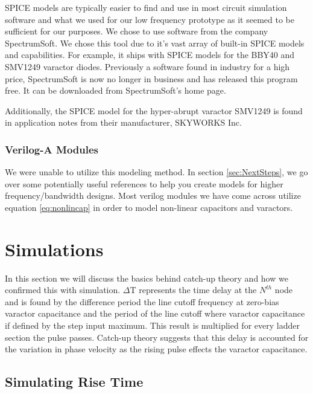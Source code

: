 \documentclass[journal]{IEEEtran} \usepackage[english]{babel}
\begin{document}
SPICE models are typically easier to find and use in most circuit simulation
software and what we used for our low frequency prototype as it seemed to be
sufficient for our purposes. We chose to use software from the company
SpectrumSoft. We chose this tool due to it's vast array of built-in SPICE models
and capabilities. For example, it ships with SPICE models for the BBY40 and
SMV1249 varactor diodes. Previously a software found in industry for a high
price, SpectrumSoft is now no longer in business and has released this program
free. It can be downloaded from SpectrumSoft's home page.


Additionally, the SPICE model for the hyper-abrupt varactor SMV1249 is found in
application notes from their manufacturer, SKYWORKS Inc.




\subsubsection{Verilog-A Modules}\label{subsub:VerilogAMS}

We were unable to utilize this modeling method. In section \ref{sec:NextSteps}, 
we go over some potentially useful references to help you create models for
higher frequency/bandwidth designs. Most verilog modules we have come across
utilize equation \ref{eq:nonlincap} in order to model non-linear capacitors and
varactors.







\section{ Simulations }\label{sec:sims}

In this section we will discuss the basics behind catch-up
theory\cite{wilson1991pulse} and how we confirmed this with simulation.
$\Delta$T represents the time delay at the $N^{th}$ node and is found by the
difference period the line cutoff frequency at zero-bias varactor capacitance
and the period of the line cutoff where varactor capacitance if defined by the
step input maximum. This result is multiplied for every ladder section the pulse
passes. Catch-up theory suggests that this delay is accounted for the variation
in phase velocity as the rising pulse effects the varactor capacitance.

\subsection{Simulating Rise Time}\label{sub:simsRise}
\end{document}
